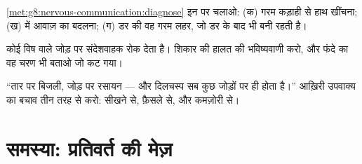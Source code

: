 \begin{exercise}[$\star\star$]\label{exo:g8:nervous-communication:10}
\cref{met:g8:nervous-communication:diagnose} इन पर चलाओ: (क) गरम कड़ाही
से हाथ खींचना; (ख)  में आवाज़ का बदलना; (ग) डर की वह गरम लहर, जो
डर के बाद भी बनी रहती है।
\end{exercise}

\begin{exercise}[$\star\star$]\label{exo:g8:nervous-communication:11}
कोई विष  वाले जोड़ पर संदेशवाहक रोक देता है। शिकार की हालत की
भविष्यवाणी करो, और फंदे का वह चरण भी बताओ जो कट गया।
\end{exercise}

\begin{exercise}[$\star\star\star$]\label{exo:g8:nervous-communication:12}
``तार पर बिजली, जोड़ पर रसायन --- और दिलचस्प सब कुछ जोड़ों पर ही होता
है।'' आख़िरी उपवाक्य का बचाव तीन तरह से करो: सीखने से, फ़ैसले से, और
कमज़ोरी से।
\end{exercise}

\section{समस्या: प्रतिवर्त की मेज़}


